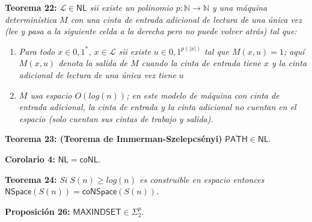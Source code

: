 \documentclass{article}
\begin{document}
\begin{flushleft}
  \textbf{Teorema 22:}
  \textit{$\mathcal{L} \in \mathsf{NL}$ sii existe un polinomio $p : \mathbb{N} \rightarrow \mathbb{N}$ y una
  máquina determinística $M$ con una cinta de entrada adicional de lectura de una única vez (lee y pasa a la 
  siguiente celda a la derecha pero no puede volver atrás) tal que:}
\end{flushleft}
\begin{enumerate}
  \item \textit{Para todo $x \in {0, 1}^*$, $x \in \mathcal{L}$ sii existe $u \in {0, 1}^{p(|x|)}$ tal que $M (x, u) = 
  1$; aquí $M (x, u)$ denota la salida de $M$ cuando la cinta de entrada tiene $x$ y la cinta adicional de lectura 
  de una única vez tiene $u$}
  \item \textit{$M$ usa espacio $O(log(n))$; en este modelo de máquina con cinta de entrada adicional, la cinta de entrada 
  y la cinta adicional no cuentan en el espacio (solo cuentan sus cintas de trabajo y salida).}
\end{enumerate}

\begin{flushleft}
  \textbf{Teorema 23: \hypertarget{immerman}{\textcolor{Bittersweet}{(Teorema de Immerman-Szelepcsényi)}}}
  $\overline{\mathsf{PATH}} \in \mathsf{NL}$.
\end{flushleft}

\begin{flushleft}
  \textbf{Corolario 4:}
  $\mathsf{NL} = \mathsf{coNL}$.
\end{flushleft}

\begin{flushleft}
  \textbf{Teorema 24:}
  \textit{Si $S(n) \geq log(n)$ es construible en espacio entonces $\mathsf{NSpace}(S(n)) = \mathsf{coNSpace}
  (S(n))$.}
\end{flushleft}

\begin{flushleft}
  \textbf{Proposición 26:}
  $\textsf{MAXINDSET} \in \Sigma ^p _2$.
\end{flushleft}
\end{document}
